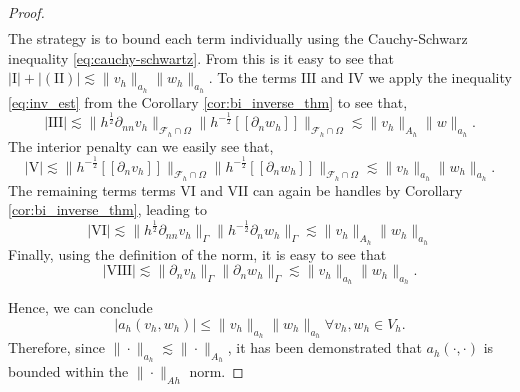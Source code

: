 \documentclass[11pt]{article}
\theoremstyle{remark}
\newcommand{\jump}[1]{\left[\!\left[ #1 \right]\!\right]}
\newcommand{\abs}[1]{\left\lvert #1 \right\rvert}
\renewcommand{\le}{\leqslant}
\numberwithin{equation}{section}
\begin{document}
\begin{proof}
\begin{equation}
\begin{split}
                    \end{split}
                \end{equation}
                The strategy is to bound each term individually using the Cauchy-Schwarz inequality \eqref{eq:cauchy-schwartz}. From this is it easy to see that $\abs{ \mathrm{I}    } +  \abs{( \mathrm{II} )   }   \lesssim \| v_{h} \|_{a_{h}  }^{  } \| w_{h} \|_{ a_{h}
                }^{  } $. To the terms $
                \mathrm{III}  $ and  $ \mathrm{IV}  $ we apply the inequality \eqref{eq:inv_est} from the Corollary \ref{cor:bi_inverse_thm} to see that,
                \begin{equation}
                    \label{eq:invest_1}
                    \abs{\mathrm{III}   }  \lesssim  \|h^{\frac{1}{2}} \partial _{n n} v_{h}  \|_{ \mathcal{F}_{h}^{} \cap \Omega}^{  }\| h^{-\frac{1}{2}} \jump{ \partial _{n} w_{h} }     \|_{\mathcal{F}_{h}^{} \cap \Omega}^{  } \lesssim  \| v_{h} \|_{A_{h}
                    }^{  } \|w    \|_{ a_{h}}^{  }.
                \end{equation}
              The interior penalty can we easily see that,
              \begin{equation}
              \abs{  \mathrm{V}   }  \lesssim  \|h^{-\frac{1}{2}} \jump{ \partial _{n} v_{h}}  \|_{ \mathcal{F}_{h}^{} \cap \Omega }^{  }
             \|h^{-\frac{1}{2}} \jump{ \partial _{n} w_{h}}  \|_{ \mathcal{F}_{h}^{} \cap \Omega }^{  }  \lesssim  \| v_{h}  \|_{ a_{h} }^{  }
             \| w_{h}  \|_{ a_{h} }^{  }.
              \end{equation}
              The remaining terms terms $  \mathrm{VI} $ and $  \mathrm{VII} $ can again be handles by Corollary \ref{cor:bi_inverse_thm}, leading to
              \begin{equation}
                    \label{eq:invest_2}
                \abs{  \mathrm{VI}   }  \lesssim \| h^{\frac{1}{2}}\partial _{nn} v_{h} \|_{\Gamma   }^{  } \| h^{-\frac{1}{2}} \partial _{n}w_{h} \|_{\Gamma   }^{  }  \lesssim \|  v_{h} \|_{A_{h}  }^{  } \| w_{h} \|_{ a_{h}   }^{  }
              \end{equation}
             Finally, using the definition of the norm, it is easy to see that
             \[
\abs{  \mathrm{VIII}   }  \lesssim \| \partial _{n}v_{h} \|_{ \Gamma  }^{  }
\| \partial _{n} w_{h} \|_{ \Gamma  }^{  }  \lesssim \| v_{h} \|_{ a_{h} }^{  }
\| w_{h} \|_{ a_{h} }^{  } .
             \]

             Hence, we can conclude \begin{equation}
                 \label{eq:ah_ahnorm}
                 \abs{ a_{h}( v_{h},w_{h})  } \le \| v_{h} \|_{ a_{h} }^{  } \| w_{h} \|_{ a_{h} }^{  } \forall v_{h},w_{h} \in V_{h}.
             \end{equation}
             Therefore, since $\| \cdot  \|_{a_{h}  }^{  } \lesssim  \| \cdot  \|_{A_{h}  }^{  } $, it has been demonstrated that $a_{h}( \cdot ,\cdot )$ is bounded within the $\|\cdot   \|_{A{h} }^{ }$ norm.


\end{proof}
\end{document}
